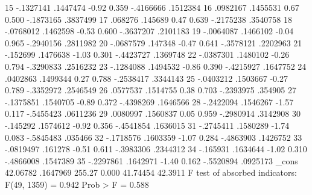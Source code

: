          15  {\VBAR}  -.1327141   .1447474    -0.92   0.359    -.4166666    .1512384
         16  {\VBAR}   .0982167   .1455531     0.67   0.500    -.1873165    .3837499
         17  {\VBAR}    .068276    .145689     0.47   0.639    -.2175238    .3540758
         18  {\VBAR}  -.0768012   .1462598    -0.53   0.600    -.3637207    .2101183
         19  {\VBAR}  -.0064087   .1466102    -0.04   0.965    -.2940156    .2811982
         20  {\VBAR}  -.0687579    .147348    -0.47   0.641    -.3578121    .2202963
         21  {\VBAR}   -.152699   .1476638    -1.03   0.301    -.4423727    .1369748
         22  {\VBAR}  -.0387301   .1480102    -0.26   0.794    -.3290833    .2516232
         23  {\VBAR}  -.1284088   .1494532    -0.86   0.390    -.4215927    .1647752
         24  {\VBAR}   .0402863   .1499344     0.27   0.788    -.2538417    .3344143
         25  {\VBAR}  -.0403212   .1503667    -0.27   0.789    -.3352972    .2546549
         26  {\VBAR}   .0577537   .1514755     0.38   0.703    -.2393975     .354905
         27  {\VBAR}  -.1375851   .1540705    -0.89   0.372    -.4398269    .1646566
         28  {\VBAR}  -.2422094   .1546267    -1.57   0.117    -.5455423    .0611236
         29  {\VBAR}   .0080997   .1560837     0.05   0.959    -.2980914    .3142908
         30  {\VBAR}   -.145292   .1574612    -0.92   0.356    -.4541854    .1636015
         31  {\VBAR}  -.2745411   .1580289    -1.74   0.083    -.5845483     .035466
         32  {\VBAR}  -.1718576   .1603359    -1.07   0.284    -.4863903    .1426752
         33  {\VBAR}  -.0819497    .161278    -0.51   0.611    -.3983306    .2344312
         34  {\VBAR}   -.165931   .1634644    -1.02   0.310    -.4866008    .1547389
         35  {\VBAR}  -.2297861   .1642971    -1.40   0.162    -.5520894    .0925173
             {\VBAR}
       _cons {\VBAR}   42.06782   .1647969   255.27   0.000     41.74454     42.3911
F test of absorbed indicators: F(49, 1359) = 0.942            Prob > F = 0.588
{\smallskip}
